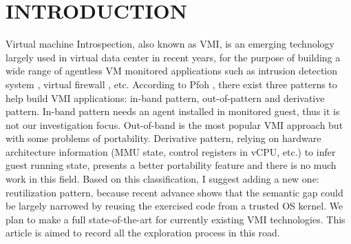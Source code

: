 
\chapter{INTRODUCTION} %

\label{Chapter1} %



Virtual machine Introspection, also known as VMI, is an emerging technology largely used in virtual data center in recent years, for the purpose of building a wide range of agentless VM monitored applications such as intrusion detection system \citep{Reference1}, virtual firewall \citep{Reference2}, etc. According to Pfoh \citep{Reference5}, there exist three patterns to help build VMI applications: in-band pattern, out-of-pattern and derivative pattern. In-band pattern needs an agent installed in monitored guest, thus it is not our investigation focus. Out-of-band is the most popular VMI approach but with some problems of portability.    Derivative pattern, relying on hardware architecture information (MMU state, control registers in vCPU, etc.) to infer guest running state, presents a better portability feature and there is no much work in this field. Based on this classification, I suggest adding a new one: reutilization pattern, because recent advance shows that the semantic gap could be largely narrowed by reusing the exercised code from a trusted OS kernel. We plan to make a full state-of-the-art for currently existing VMI technologies. This article is aimed to record all the exploration process in this road.